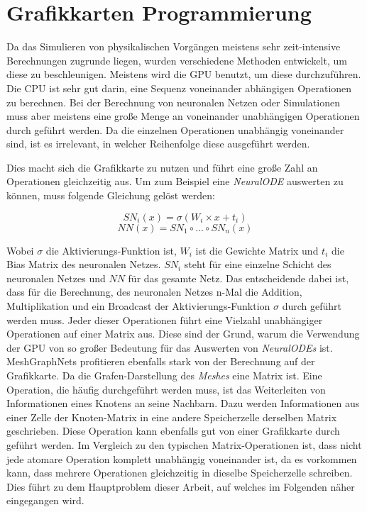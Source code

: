 
\section{Grafikkarten Programmierung} \label{sec:gpu}

Da das Simulieren von physikalischen Vorgängen 
meistens sehr zeit-intensive Berechnungen zugrunde liegen, 
wurden verschiedene Methoden entwickelt, 
um diese zu beschleunigen.
Meistens wird die GPU benutzt, um diese durchzuführen.
Die CPU ist sehr gut darin, eine Sequenz voneinander abhängigen Operationen zu berechnen.
Bei der Berechnung von neuronalen Netzen oder Simulationen muss aber meistens eine große Menge 
an voneinander unabhängigen Operationen durch geführt werden.
Da die einzelnen Operationen unabhängig voneinander sind, ist es irrelevant, in welcher Reihenfolge diese ausgeführt werden.

Dies macht sich die Grafikkarte zu nutzen und führt eine große Zahl an Operationen gleichzeitig aus.
Um zum Beispiel eine \textit{NeuralODE} auswerten zu können, muss folgende Gleichung gelöst werden:

$$
SN_i(x) = \sigma ( W_i \times x + t_i )
$$
$$
NN(x) = SN_1 \circ ... \circ SN_n (x)
$$

Wobei $\sigma$ die Aktivierungs-Funktion ist, $W_i$ ist die Gewichte Matrix und $t_i$ die Bias Matrix des neuronalen Netzes.
$SN_i$ steht für eine einzelne Schicht des neuronalen Netzes und $NN$ für das gesamte Netz.
Das entscheidende dabei ist, dass für die Berechnung, des neuronalen Netzes n-Mal die Addition, Multiplikation und ein Broadcast der Aktivierungs-Funktion
$\sigma$ durch geführt werden muss.
Jeder dieser Operationen führt eine Vielzahl unabhängiger Operationen auf einer Matrix aus.
Diese sind der Grund, warum die Verwendung der GPU von so großer Bedeutung für das Auswerten von \textit{NeuralODEs} ist.
MeshGraphNets profitieren ebenfalls stark von der Berechnung auf der Grafikkarte.
Da die Grafen-Darstellung des \textit{Meshes} eine Matrix ist.
Eine Operation, die häufig durchgeführt werden muss, ist das Weiterleiten von Informationen eines Knotens an seine Nachbarn.
Dazu werden Informationen aus einer Zelle der Knoten-Matrix in eine andere Speicherzelle derselben Matrix geschrieben.
Diese Operation kann ebenfalls gut von einer Grafikkarte durch geführt werden.
Im Vergleich zu den typischen Matrix-Operationen ist, dass nicht jede atomare Operation komplett unabhängig voneinander ist,
da es vorkommen kann, dass mehrere Operationen gleichzeitig in dieselbe Speicherzelle schreiben.
Dies führt zu dem Hauptproblem dieser Arbeit, auf welches im Folgenden näher eingegangen wird.

% 